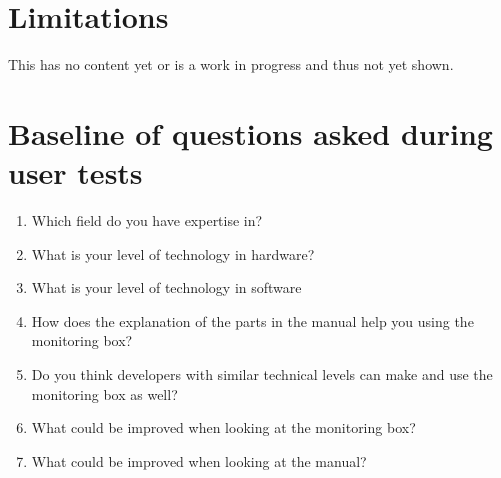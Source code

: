 \documentclass[conference]{IEEEtran}
\begin{document}
\section{Limitations}
This has no content yet or is a work in progress and thus not yet shown.







\appendices
\section{Baseline of questions asked during user tests}
\begin{enumerate}
\item Which field do you have expertise in?
\item What is your level of technology in hardware?
\item What is your level of technology in software
\item How does the explanation of the parts in the manual help you using the monitoring box?
\item Do you think developers with similar technical levels can make and use the monitoring box as well?\item What could be improved when looking at the monitoring box?
\item What could be improved when looking at the manual?
\end{enumerate}
\end{document}
